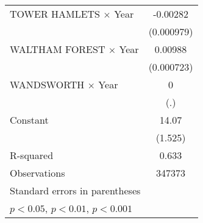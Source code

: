 {\begin{longtable}{l*{1}{c}}
\addlinespace
TOWER HAMLETS $\times$ Year&    -0.00282\sym{**} \\
                    &  (0.000979)         \\
\addlinespace
WALTHAM FOREST $\times$ Year&     0.00988\sym{***}\\
                    &  (0.000723)         \\
\addlinespace
WANDSWORTH $\times$ Year&           0         \\
                    &         (.)         \\
\addlinespace
Constant            &       14.07\sym{***}\\
                    &     (1.525)         \\
\midrule
R-squared           &       0.633         \\
Observations        &      347373         \\
\bottomrule
\multicolumn{2}{l}{\footnotesize Standard errors in parentheses}\\
\multicolumn{2}{l}{\footnotesize \sym{*} \(p<0.05\), \sym{**} \(p<0.01\), \sym{***} \(p<0.001\)}\\
\end{longtable}
\label{tab:full_MV_regression_results}
}
